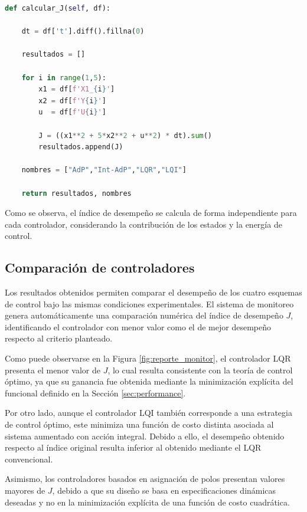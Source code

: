 \documentclass[12pt,letterpaper,twoside]{article}
\begin{document}
\begin{lstlisting}[language=Python, firstnumber=247, caption={Cálculo del índice de desempeño a partir de datos experimentales}, label={lst:indiceJ}]
def calcular_J(self, df):

    dt = df['t'].diff().fillna(0)

    resultados = []

    for i in range(1,5):
        x1 = df[f'X1_{i}']
        x2 = df[f'Y{i}']
        u  = df[f'U{i}']

        J = ((x1**2 + 5*x2**2 + u**2) * dt).sum()
        resultados.append(J)

    nombres = ["AdP","Int-AdP","LQR","LQI"]

    return resultados, nombres
\end{lstlisting}

Como se observa, el índice de desempeño se calcula de forma independiente para cada controlador, considerando la contribución de los estados y la energía de control.

\subsection{Comparación de controladores}

Los resultados obtenidos permiten comparar el desempeño de los cuatro esquemas de control bajo las mismas condiciones experimentales. El sistema de monitoreo genera automáticamente una comparación numérica del índice de desempeño \(J\), identificando el controlador con menor valor como el de mejor desempeño respecto al criterio planteado.

Como puede observarse en la Figura \ref{fig:reporte_monitor}, el controlador LQR presenta el menor valor de \(J\), lo cual resulta consistente con la teoría de control óptimo, ya que su ganancia fue obtenida mediante la minimización explícita del funcional definido en la Sección \ref{sec:performance}.

Por otro lado, aunque el controlador LQI también corresponde a una estrategia de control óptimo, este minimiza una función de costo distinta asociada al sistema aumentado con acción integral. Debido a ello, el desempeño obtenido respecto al índice original resulta inferior al obtenido mediante el LQR convencional.

Asimismo, los controladores basados en asignación de polos presentan valores mayores de \(J\), debido a que su diseño se basa en especificaciones dinámicas deseadas y no en la minimización explícita de una función de costo cuadrática.
\end{document}
